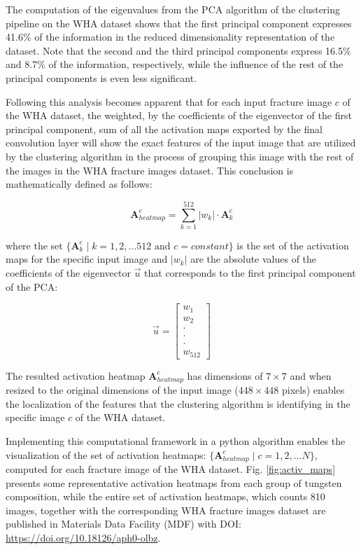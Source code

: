 \documentclass[authoryear,preprint,review,12pt, singleside]{elsarticle}
\begin{document}
The computation of the eigenvalues from the PCA algorithm of the clustering pipeline on the WHA dataset shows that the first principal component expresses 41.6\% of the information in the reduced dimensionality representation of the dataset. Note that the second and the third principal components express 16.5\% and 8.7\% of the information, respectively, while the influence of the rest of the principal components is even less significant.  

Following this analysis becomes apparent that for each input fracture image $c$ of the WHA dataset, the weighted, by the coefficients of the eigenvector of the first principal component, sum of all the activation maps exported by the final convolution layer will show the exact features of the input image that are utilized by the clustering algorithm in the process of grouping this image with the rest of the images in the WHA fracture images dataset. This conclusion is mathematically defined as follows:

\begin{equation*}
\textbf{A}_{heatmap}^c = \sum_{k=1}^{512} |w_k| \cdot \textbf{A}^c_k 
\end{equation*}  

where the set  $\{\textbf{A}^c_k \; | \;  k=1,2, ... 512 \text{ and } c=constant\}$ is the set of the activation maps for the specific input image and  $|w_k|$ are the absolute values of the coefficients of the eigenvector $\vec{u}$ that corresponds to the first principal component of the PCA:

\begin{equation*}
\vec{u} = \begin{bmatrix}  w_1 \\
						   w_2 \\
						  \cdot \\
						  \cdot \\
						  \cdot \\
						  w_{512}
		   \end{bmatrix}
\end{equation*}

The resulted activation heatmap $\textbf{A}_{heatmap}^c$ has dimensions of $7 \times 7$ and when resized to the original dimensions of the input image ($448 \times 448$ pixels) enables the localization of the features that the clustering algorithm is identifying in the specific image $c$ of the WHA dataset.

Implementing this computational framework in a python algorithm enables the visualization of the set of activation heatmaps: $\{\textbf{A}_{heatmap}^c \; | \; c=1,2, ... N\}$, computed for each fracture image of the WHA dataset. Fig. \ref{fig:activ_maps} presents some representative activation heatmaps from each group of tungsten composition, while the entire set of activation heatmaps, which counts 810 images, together with the corresponding WHA fracture images dataset are published in Materials Data Facility (MDF) with DOI: \url{https://doi.org/10.18126/aph0-olbz}. 
\end{document}
